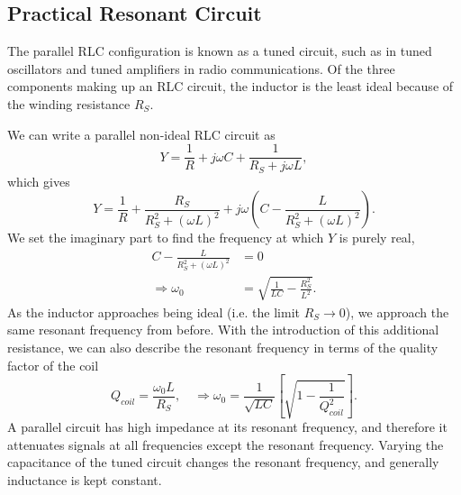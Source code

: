 \documentclass{article}
\begin{document}
\subsection{Practical Resonant Circuit}
The parallel RLC configuration is known as a tuned circuit, such as in tuned oscillators and tuned amplifiers in radio communications. Of the three components making up an RLC circuit, the inductor is the least ideal because of the winding resistance $R_S$.

We can write a parallel non-ideal RLC circuit as 
\[
    Y=\frac{1}{R}+j\omega C+\frac{1}{R_S+j\omega L},
\]
which gives 
\[
    Y=\frac{1}{R}+\frac{R_S}{R_S^2+\left( \omega L \right)^2}+j\omega \left( C-\frac{L}{R_S^2+\left( \omega L \right)^2} \right).
\]
We set the imaginary part to find the frequency at which $Y$ is purely real,
\begin{align*}
    C-\frac{L}{R_S^2+\left( \omega L \right)^2} &= 0\\
    \Rightarrow \omega _0&=\sqrt{\frac{1}{LC}-\frac{R_S^2}{L^2}}.
\end{align*}
As the inductor approaches being ideal (i.e. the limit $R_S\to 0$), we approach the same resonant frequency from before. With the introduction of this additional resistance, we can also describe the resonant frequency in terms of the quality factor of the coil 
\[
    Q_{coil}=\frac{\omega _0L}{R_S},\quad\Rightarrow\omega _0=\frac{1}{\sqrt{LC}}\left[ \sqrt{1-\frac{1}{Q_{coil}^2}} \right].
\]
A parallel circuit has high impedance at its resonant frequency, and therefore it attenuates signals at all frequencies except the resonant frequency. Varying the capacitance of the tuned circuit changes the resonant frequency, and generally inductance is kept constant.
\end{document}
